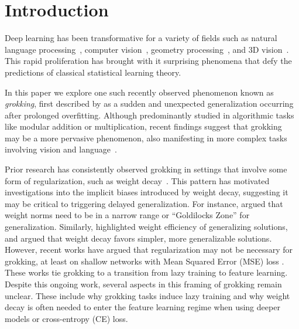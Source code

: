 \section{Introduction}


Deep learning has been transformative for a variety of fields such as natural language processing~\citep{devlin2018bert}, computer vision~\citep{krizhevsky2012imagenet}, geometry processing~\citep{qi2017pointnet}, and 3D vision~\citep{deng2018ppfnet}. This rapid proliferation has brought with it surprising phenomena that defy the predictions of classical statistical learning theory.


In this paper we explore one such recently observed phenomenon known as \emph{grokking}, first described by \citet{power2022grokking} as a sudden and unexpected generalization occurring after prolonged overfitting. Although predominantly studied in algorithmic tasks like modular addition or multiplication, recent findings suggest that grokking may be a more pervasive phenomenon, also manifesting in more complex tasks involving vision and language~\citep{lv2024language,humayun2024deep}.


Prior research has consistently observed grokking in settings that involve some form of regularization, such as weight decay~\citep{Barak2022-el, power2022grokking, Nanda2023-hf}. This pattern has motivated investigations into the implicit biases introduced by weight decay, suggesting it may be critical to triggering delayed generalization. For instance, \citet{liu2023omnigrok} argued that weight norms need to be in a narrow range or ``Goldilocks Zone'' for generalization. Similarly, \citet{Varma2023} highlighted weight efficiency of generalizing solutions, and \citet{Nanda2023-hf} argued that weight decay favors simpler, more generalizable solutions. However, recent works have argued that regularization may not be necessary for grokking, at least on shallow networks with Mean Squared Error (MSE) loss \citep{Kumar2023-hz, Lyu2023-ga, Gromov2023-nh}. These works tie grokking to a transition from lazy training \citep{Chizat_Oyallon_Bach_2018} to feature learning. Despite this ongoing work, several aspects in this framing of grokking remain unclear. These include why grokking tasks induce lazy training and why weight decay is often needed to enter the feature learning regime when using deeper models or cross-entropy (CE) loss.


